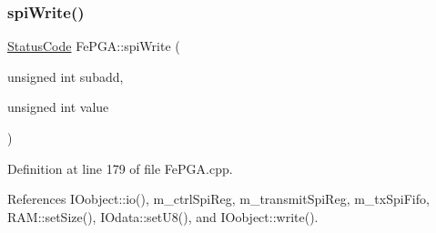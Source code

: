 \subsubsection{\texorpdfstring{spi\+Write()}{spiWrite()}\hspace{0.1cm}{\footnotesize\ttfamily [3/3]}}
{\footnotesize\ttfamily \hyperlink{classStatusCode}{Status\+Code} Fe\+P\+G\+A\+::spi\+Write (\begin{DoxyParamCaption}\item[{unsigned int}]{subadd,  }\item[{unsigned int}]{value }\end{DoxyParamCaption})}



Definition at line 179 of file Fe\+P\+G\+A.\+cpp.



References I\+Oobject\+::io(), m\+\_\+ctrl\+Spi\+Reg, m\+\_\+transmit\+Spi\+Reg, m\+\_\+tx\+Spi\+Fifo, R\+A\+M\+::set\+Size(), I\+Odata\+::set\+U8(), and I\+Oobject\+::write().


